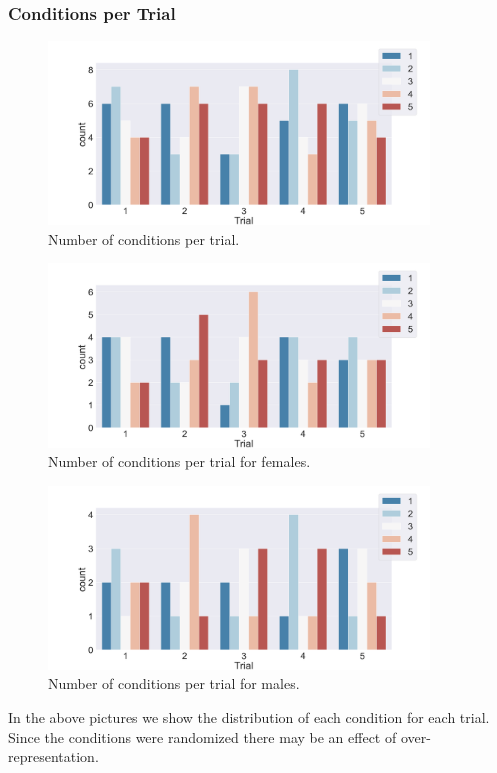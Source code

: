 \subsubsection{Conditions per Trial}
\begin{figure}[H]
\vspace*{-3mm}
 \centering
 \captionsetup{justification=centering,margin=0.1cm}
\includegraphics[width=0.9\textwidth]{Files/Plots/condition_by_trial.png}
 \caption{Number of conditions per trial.}
 \label{fig:condPerTrial}
  \end{figure}
\begin{figure}[H]
\vspace*{-10mm}
\centering
\captionsetup{justification=centering,margin=0.1cm}
\includegraphics[width=0.9\textwidth]{Files/Plots/condition_by_trial_females.png}
 \caption{Number of conditions per trial for females.}
 \label{fig:condPerTrialF}
\end{figure}

\begin{figure}[H]
\vspace*{-10mm}
\centering
\captionsetup{justification=centering,margin=0.1cm}
\includegraphics[width=0.9\textwidth]{Files/Plots/condition_by_trial_males.png}
\caption{Number of conditions per trial for males.}
\label{fig:condPerTrialM}
\end{figure}
In the above pictures we show the distribution of each condition for each trial. Since the conditions were randomized there may be an effect of over-representation.

